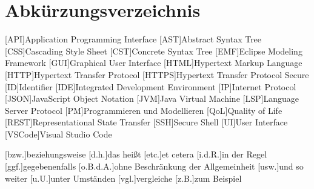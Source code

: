 \chapter*{Abkürzungsverzeichnis}


\begin{acronym}[XXXXXX]
    [API]{Application Programming Interface}
    [AST]{Abstract Syntax Tree}
    [CSS]{Cascading Style Sheet}
    [CST]{Concrete Syntax Tree}
    [EMF]{Eclipse Modeling Framework}
    [GUI]{Graphical User Interface}
    [HTML]{Hypertext Markup Language}
    [HTTP]{Hypertext Transfer Protocol}
    [HTTPS]{Hypertext Transfer Protocol Secure}
    [ID]{Identifier}
    [IDE]{Integrated Development Environment}
    [IP]{Internet Protocol}
    [JSON]{JavaScript Object Notation}
    [JVM]{Java Virtual Machine}
    [LSP]{Language Server Protocol}
    [PM]{Programmieren und Modellieren}
    [QoL]{Quality of Life}
    [REST]{Representational State Transfer}
    [SSH]{Secure Shell}
    [UI]{User Interface}
    [VSCode]{Visual Studio Code}

    [bzw.]{beziehungsweise}
    [d.h.]{das heißt}
    [etc.]{et cetera}
    [i.d.R.]{in der Regel}
    [ggf.]{gegebenenfalls}
    [o.B.d.A.]{ohne Beschränkung der Allgemeinheit}
    [usw.]{und so weiter}
    [u.U.]{unter Umständen}
    [vgl.]{vergleiche}
    [z.B.]{zum Beispiel}
\end{acronym}
